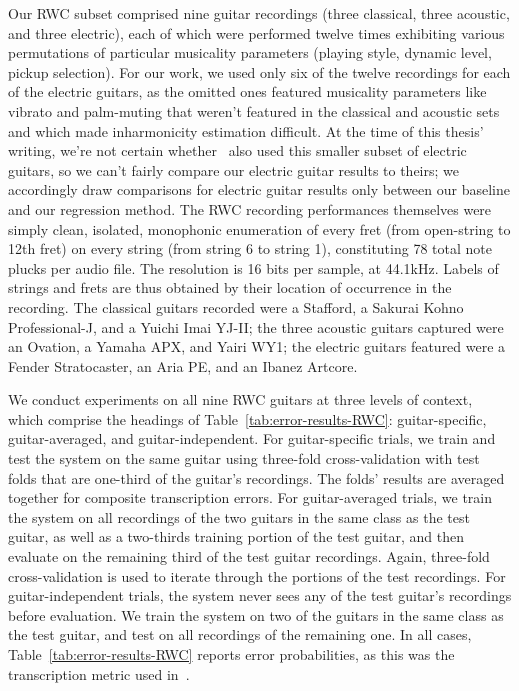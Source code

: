 \documentclass[12pt]{cmuthesis}
\begin{document}
Our RWC subset comprised nine guitar recordings (three classical, three acoustic, and three electric), each of which were performed twelve times exhibiting various permutations of particular musicality parameters (playing style, dynamic level, pickup selection). For our work, we used only six of the twelve recordings for each of the electric guitars, as the omitted ones featured musicality parameters like vibrato and palm-muting that weren't featured in the classical and acoustic sets and which made inharmonicity estimation difficult. At the time of this thesis' writing, we're not certain whether~\cite{barbanchoi2012} also used this smaller subset of electric guitars, so we can't fairly compare our electric guitar results to theirs; we accordingly draw comparisons for electric guitar results only between our baseline and our regression method. The RWC recording performances themselves were simply clean, isolated, monophonic enumeration of every fret (from open-string to 12th fret) on every string (from string 6 to string 1), constituting 78 total note plucks per audio file. The resolution is 16 bits per sample, at 44.1kHz. Labels of strings and frets are thus obtained by their location of occurrence in the recording. The classical guitars recorded were a Stafford, a Sakurai Kohno Professional-J, and a Yuichi Imai YJ-II; the three acoustic guitars captured were an Ovation, a Yamaha APX, and Yairi WY1; the electric guitars featured were a Fender Stratocaster, an Aria PE, and an Ibanez Artcore.


We conduct experiments on all nine RWC guitars at three levels of context, which comprise the headings of Table~\ref{tab:error-results-RWC}: guitar-specific, guitar-averaged, and guitar-independent. For guitar-specific trials, we train and test the system on the same guitar using three-fold cross-validation with test folds that are one-third of the guitar's recordings. The folds' results are averaged together for composite transcription errors. For guitar-averaged trials, we train the system on all recordings of the two guitars in the same class as the test guitar, as well as a two-thirds training portion of the test guitar, and then evaluate on the remaining third of the test guitar recordings. Again, three-fold cross-validation is used to iterate through the portions of the test recordings. For guitar-independent trials, the system never sees any of the test guitar's recordings before evaluation. We train the system on two of the guitars in the same class as the test guitar, and test on all recordings of the remaining one. In all cases, Table~\ref{tab:error-results-RWC} reports error probabilities, as this was the transcription metric used in~\cite{barbanchoi2012}.
\end{document}

